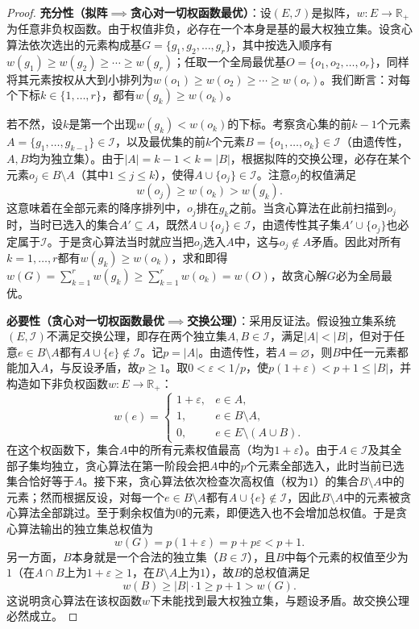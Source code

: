 \begin{proof}
\textbf{充分性（拟阵$\implies$贪心对一切权函数最优）}：设$(E,\mathcal I)$是拟阵，$w:E\to\mathbb R_+$为任意非负权函数。由于权值非负，必存在一个本身是基的最大权独立集。设贪心算法依次选出的元素构成基$G=\{g_1,g_2,\ldots,g_r\}$，其中按选入顺序有$w(g_1)\geq w(g_2)\geq\cdots\geq w(g_r)$；任取一个全局最优基$O=\{o_1,o_2,\ldots,o_r\}$，同样将其元素按权从大到小排列为$w(o_1)\geq w(o_2)\geq\cdots\geq w(o_r)$。我们断言：对每个下标$k\in\{1,\ldots,r\}$，都有$w(g_k)\geq w(o_k)$。

若不然，设$k$是第一个出现$w(g_k)<w(o_k)$的下标。考察贪心集的前$k-1$个元素$A=\{g_1,\ldots,g_{k-1}\}\in\mathcal I$，以及最优集的前$k$个元素$B=\{o_1,\ldots,o_k\}\in\mathcal I$（由遗传性，$A,B$均为独立集）。由于$|A|=k-1<k=|B|$，根据拟阵的交换公理，必存在某个元素$o_j\in B\setminus A$（其中$1\leq j\leq k$），使得$A\cup\{o_j\}\in\mathcal I$。注意$o_j$的权值满足
\[
  w(o_j) \geq w(o_k) > w(g_k).
\]
这意味着在全部元素的降序排列中，$o_j$排在$g_k$之前。当贪心算法在此前扫描到$o_j$时，当时已选入的集合$A'\subseteq A$，既然$A\cup\{o_j\}\in\mathcal I$，由遗传性其子集$A'\cup\{o_j\}$也必定属于$\mathcal I$。于是贪心算法当时就应当把$o_j$选入$A$中，这与$o_j\notin A$矛盾。因此对所有$k=1,\ldots,r$都有$w(g_k)\geq w(o_k)$，求和即得$w(G)=\sum_{k=1}^r w(g_k)\geq\sum_{k=1}^r w(o_k)=w(O)$，故贪心解$G$必为全局最优。

\textbf{必要性（贪心对一切权函数最优$\implies$交换公理）}：采用反证法。假设独立集系统$(E,\mathcal I)$不满足交换公理，即存在两个独立集$A,B\in\mathcal I$，满足$|A|<|B|$，但对于任意$e\in B\setminus A$都有$A\cup\{e\}\notin\mathcal I$。记$p=|A|$。由遗传性，若$A=\varnothing$，则$B$中任一元素都能加入$A$，与反设矛盾，故$p\geq1$。取$0<\varepsilon<1/p$，使$p(1+\varepsilon)<p+1\leq|B|$，并构造如下非负权函数$w:E\to\mathbb R_+$：
\begin{equation}
  w(e) = \begin{cases}
    1+\varepsilon, & e\in A,\\
    1, & e\in B\setminus A,\\
    0, & e\in E\setminus(A\cup B).
  \end{cases}
  \label{eq:matroid-counterexample-weights}
\end{equation}
在这个权函数下，集合$A$中的所有元素权值最高（均为$1+\varepsilon$）。由于$A\in\mathcal I$及其全部子集均独立，贪心算法在第一阶段会把$A$中的$p$个元素全部选入，此时当前已选集合恰好等于$A$。接下来，贪心算法依次检查次高权值（权为$1$）的集合$B\setminus A$中的元素；然而根据反设，对每一个$e\in B\setminus A$都有$A\cup\{e\}\notin\mathcal I$，因此$B\setminus A$中的元素被贪心算法全部跳过。至于剩余权值为$0$的元素，即便选入也不会增加总权值。于是贪心算法输出的独立集总权值为
\[
  w(G) = p(1+\varepsilon) = p + p\varepsilon < p + 1.
\]
另一方面，$B$本身就是一个合法的独立集（$B\in\mathcal I$），且$B$中每个元素的权值至少为$1$（在$A\cap B$上为$1+\varepsilon\geq1$，在$B\setminus A$上为$1$），故$B$的总权值满足
\[
  w(B) \geq |B|\cdot 1 \geq p + 1 > w(G).
\]
这说明贪心算法在该权函数$w$下未能找到最大权独立集，与题设矛盾。故交换公理必然成立。
\end{proof}

